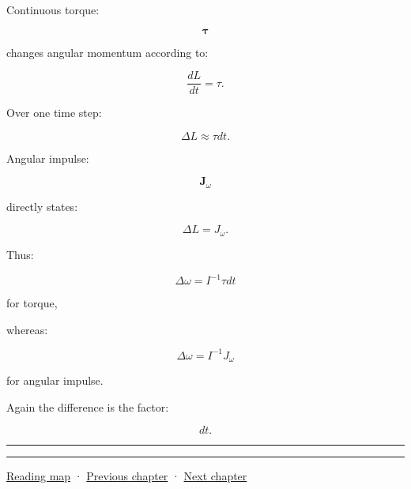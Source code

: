 Continuous torque:

\[
\boldsymbol\tau
\]

changes angular momentum according to:

\[
\frac{dL}{dt}
=
\tau.
\]

Over one time step:

\[
\Delta L
\approx
\tau dt.
\]

Angular impulse:

\[
\mathbf J_\omega
\]

directly states:

\[
\Delta L
=
J_\omega.
\]

Thus:

\[
\Delta\omega
=
I^{-1}\tau dt
\]

for torque,

whereas:

\[
\Delta\omega
=
I^{-1}J_\omega
\]

for angular impulse.

Again the difference is the factor:

\[
dt.
\]

\begin{center}\rule{0.5\linewidth}{0.5pt}\end{center}

\begin{center}\rule{0.5\linewidth}{0.5pt}\end{center}

\hyperref[volume-reading-map]{Reading map} · \hyperref[06-engine-ii-ch035-a-complete-rigid-body-state-before-the-formula-audit]{Previous chapter} · \hyperref[06-engine-ii-ch037-physical-examples-and-state-validation]{Next chapter}
